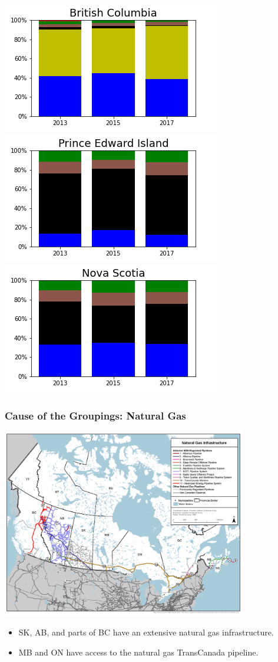 \documentclass{beamer}
\begin{document}
\begin{frame}
\includegraphics[width=0.25\linewidth]{bc.png}%
\includegraphics[width=0.25\linewidth]{pe.png}%
\includegraphics[width=0.25\linewidth]{ns.png}


\end{frame}


\begin{frame}

\frametitle{Cause of the Groupings: Natural Gas}

\begin{center}
\includegraphics[width=0.8\textwidth, trim={0 80pt 0 20pt}, clip]{natural_gas_pipeline_natural_resources_canada}
\end{center}
\vspace{-10pt}

\small
\begin{itemize}
	\item SK, AB, and parts of BC have an extensive natural gas infrastructure.
	\item MB and ON have access to the natural gas TransCanada pipeline.
\end{itemize}
\normalsize
\end{frame}
\end{document}

